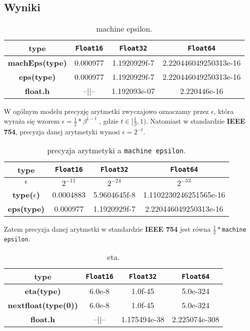 \documentclass{article}
\begin{document}
\begin{center}
    \subsection{Wyniki}
    \begin{table}[h!]
    \centering
    \begin{tabular}{||c c c c||} 
    \hline
    \textbf{type} & \texttt{Float16} & \texttt{Float32} & \texttt{Float64} \\ [0.5ex]
    \hline\hline
    \textbf{machEps(type)} & 0.000977 & 1.1920929f-7 & 2.220446049250313e-16  \\ 
    \textbf{eps(type)} & 0.000977 & 1.1920929f-7 & 2.220446049250313e-16 \\
    \textbf{float.h} & --||-- & 1.192093e-07 & 2.220446e-16\\
    \hline
    \end{tabular}
    \caption{machine epsilon.}
    \label{table:1}
    \end{table}
    \large W ogólnym modelu precyzję arytmetki zwyczajowo oznaczamy przez \(\epsilon\), która wyraża się wzorem \newline
     \( \displaystyle \epsilon  = \frac{1}{2}*\beta^{1-t} \) , gdzie \(\displaystyle t \in [\frac{1}{\beta}, 1)\).\newpage
     Natomiast w standardzie \textbf{IEEE 754}, precyzja danej arytmetyki wynosi \( \displaystyle \epsilon  = 2^{-t} \).
    \begin{table}[h!]
    \centering
    \begin{tabular}{||c c c c||} 
    \hline
    \textbf{type} & \texttt{Float16} & \texttt{Float32} & \texttt{Float64} \\ [0.5ex]
    \hline\hline
    \textbf{\(\epsilon\)} & \(2^{-11}\) & \(2^{-24}\) & \(2^{-53}\)  \\
    \textbf{type(\(\epsilon\))} & 0.0004883 & 5.9604645f-8 & 1.1102230246251565e-16 \\
    \textbf{eps(type)} & 0.000977 & 1.1920929f-7 & 2.220446049250313e-16 \\
    \hline
    \end{tabular}
    \caption{precyzja arytmetyki a \texttt{machine epsilon}.}
    \label{table:2}
    \end{table}

    \large Zatem precyzja danej arytmetki w standardzie \textbf{IEEE 754} jest równa \(\frac{1}{2}*\)\texttt{machine epsilon}.

    \begin{table}[h!]
    \centering
    \begin{tabular}{||c c c c||} 
    \hline
    \textbf{type} & \texttt{Float16} & \texttt{Float32} & \texttt{Float64} \\ [0.5ex]
    \hline\hline
    \textbf{eta(type)} & 6.0e-8 & 1.0f-45 & 5.0e-324  \\ 
    \textbf{nextfloat(type(0))} & 6.0e-8 & 1.0f-45 & 5.0e-324 \\
    \textbf{float.h} & --||-- & 1.175494e-38 & 2.225074e-308\\
    \hline
    \end{tabular}
    \caption{eta.}
    \label{table:3}
    \end{table}
    

\end{center}
\end{document}
